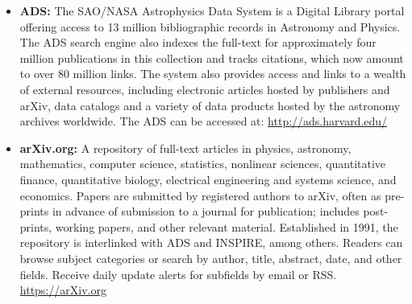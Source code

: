 \begin{itemize}
\item
  \textbf{ADS:} The SAO/NASA Astrophysics Data System is a Digital
  Library portal offering access to 13 million bibliographic records in
  Astronomy and Physics. The ADS search engine also indexes the
  full-text for approximately four million publications in this
  collection and tracks citations, which now amount to over 80 million
  links. The system also provides access and links to a wealth of
  external resources, including electronic articles hosted by publishers
  and arXiv, data catalogs and a variety of data products hosted by the
  astronomy archives worldwide. The ADS can be accessed at:
  \url{http://ads.harvard.edu/}
\item
  \textbf{arXiv.org:} A repository of full-text articles in physics,
  astronomy, mathematics, computer science, statistics, nonlinear
  sciences, quantitative finance, quantitative biology, electrical
  engineering and systems science, and economics. Papers are submitted
  by registered authors to arXiv, often as pre-prints in advance of
  submission to a journal for publication; includes post-prints, working
  papers, and other relevant material. Established in 1991, the
  repository is interlinked with ADS and INSPIRE, among others. Readers
  can browse subject categories or search by author, title, abstract,
  date, and other fields. Receive daily update alerts for subfields by
  email or RSS. \url{https://arXiv.org}


\end{itemize}
